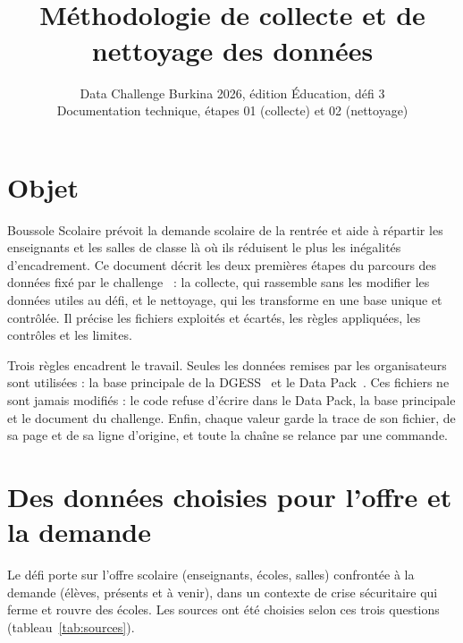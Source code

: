 \documentclass{article}
\title{\sol{}\\[3pt]
{\large\mdseries Méthodologie de collecte et de nettoyage des données}}
\author{
Data Challenge Burkina 2026, édition Éducation, défi 3\\
\affiliations
Documentation technique, étapes 01 (collecte) et 02 (nettoyage)
}
\renewcommand{\tablename}{Tableau}%
\renewcommand{\figurename}{Figure}%
\renewcommand{\refname}{Références}%
\newcommand{\sol}{Boussole Scolaire}
\begin{document}
\renewcommand{\tablename}{Tableau}\renewcommand{\figurename}{Figure}\renewcommand{\refname}{Références}
\raggedbottom

\maketitle
\thispagestyle{plain}
\pagestyle{plain}

\section{Objet}

\sol{} prévoit la demande scolaire de la rentrée et aide à répartir les enseignants et les salles de classe là où ils réduisent le plus les inégalités d'encadrement. Ce document décrit les deux premières étapes du parcours des données fixé par le challenge~\cite{dcb_document} : la collecte, qui rassemble sans les modifier les données utiles au défi, et le nettoyage, qui les transforme en une base unique et contrôlée. Il précise les fichiers exploités et écartés, les règles appliquées, les contrôles et les limites.

Trois règles encadrent le travail. Seules les données remises par les organisateurs sont utilisées : la base principale de la DGESS~\cite{dgess_base} et le Data Pack~\cite{dcb_guide}. Ces fichiers ne sont jamais modifiés : le code refuse d'écrire dans le Data Pack, la base principale et le document du challenge. Enfin, chaque valeur garde la trace de son fichier, de sa page et de sa ligne d'origine, et toute la chaîne se relance par une commande.

\section{Des données choisies pour l'offre et la demande}

Le défi porte sur l'offre scolaire (enseignants, écoles, salles) confrontée à la demande (élèves, présents et à venir), dans un contexte de crise sécuritaire qui ferme et rouvre des écoles. Les sources ont été choisies selon ces trois questions (tableau~\ref{tab:sources}).
\end{document}
